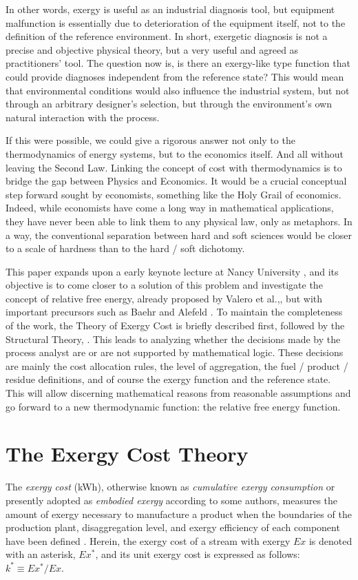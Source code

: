 \documentclass[energies,article,submit,moreauthors,pdftex]{Definitions/mdpi}
\begin{document}
In other words, exergy is useful as an industrial diagnosis tool, but equipment malfunction is essentially due to deterioration of the equipment itself, not to the definition of the reference environment. In short, exergetic diagnosis is not a precise and objective physical theory, but a very useful and agreed as practitioners’ tool. The question now is, is there an exergy-like type function that could provide diagnoses independent from the reference state? This would mean that environmental conditions would also influence the industrial system, but not through an arbitrary designer's selection, but through the environment's own natural interaction with the process.

If this were possible, we could give a rigorous answer not only to the thermodynamics of energy systems, but to the economics itself. And all without leaving the Second Law. Linking the concept of cost with thermodynamics is to bridge the gap between Physics and Economics. It would be a crucial conceptual step forward sought by economists, something like the Holy Grail of economics. Indeed, while economists have come a long way in mathematical applications, they have never been able to link them to any physical law, only as metaphors. In a way, the conventional separation between hard and soft sciences would be closer to a scale of hardness than to the hard / soft dichotomy.

This paper expands upon a early keynote lecture at Nancy University \cite{Valero2018}, and its objective is to come closer to a solution of this problem and investigate the concept of relative free energy, already proposed by Valero et al.,\cite{Valero1992b}, but with important precursors such as Baehr \cite{Baehr2005} and Alefeld \cite{Alefeld1988}. To maintain the completeness of the work, the Theory of Exergy Cost is briefly described first, followed by the Structural Theory, \cite{Valero1992a}. This leads to analyzing whether the decisions made by the process analyst are or are not supported by mathematical logic. These decisions are mainly the cost allocation rules, the level of aggregation, the fuel / product / residue definitions, and of course the exergy function and the reference state. This will allow discerning mathematical reasons from reasonable assumptions and go forward to a new thermodynamic function: the relative free energy function.

\section{The Exergy Cost Theory}
The \emph{exergy cost} (kWh), otherwise known as \emph{cumulative exergy consumption} \cite{Morris1986,Szargut1988} or presently adopted as \emph{embodied exergy} according to some authors, measures the amount of exergy necessary to manufacture a product when the boundaries of the production plant, disaggregation level, and exergy efficiency of each component have been defined \cite{Valero1986a,Lozano1993}. Herein, the exergy cost of a stream with exergy $Ex$ is denoted with an asterisk, $Ex^*$, and its unit exergy cost is expressed as follows: $k^*\equiv Ex^*/Ex$.
\end{document}

